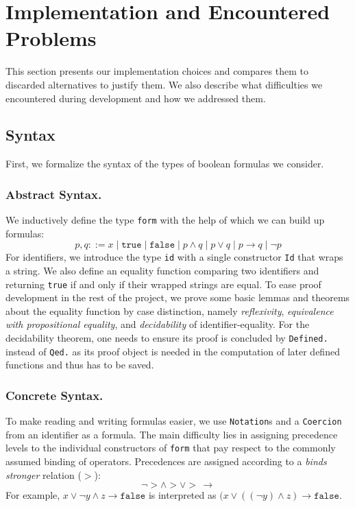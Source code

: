 \section{Implementation and Encountered Problems}\label{sec:impl}

This section presents our implementation choices and compares them to discarded alternatives to justify them. 
We also describe what difficulties we encountered during development and how we addressed them.

\subsection{Syntax}

First, we formalize the syntax of the types of boolean formulas we consider. 

\subsubsection{Abstract Syntax.}

We inductively define the type \texttt{form} with the help of which we can build up formulas:
\begin{equation*}
    p, q ::= x\;|\;\texttt{true}\;|\;\texttt{false}\;|\;p \land q\;|\;p \lor q\;|\;p \rightarrow q\;|\;\neg p
\end{equation*}
For identifiers, we introduce the type \texttt{id} with a single constructor \texttt{Id} that wraps a string. 
We also define an equality function comparing two identifiers and returning \texttt{true} if and only if their wrapped strings are equal. 
To ease proof development in the rest of the project, we prove some basic lemmas and theorems about the equality function by case distinction, namely \emph{reflexivity}, \emph{equivalence with propositional equality}, and \emph{decidability} of identifier-equality.
For the decidability theorem, one needs to ensure its proof is concluded by \texttt{Defined.} instead of \texttt{Qed.} as its proof object is needed in the computation of later defined functions and thus has to be saved.

\subsubsection{Concrete Syntax.}

To make reading and writing formulas easier, we use \texttt{Notation}s and a \texttt{Coercion} from an identifier as a formula. 
The main difficulty lies in assigning precedence levels to the individual constructors of \texttt{form} that pay respect to the commonly assumed binding of operators. 
Precedences are assigned according to a \emph{binds stronger} relation ($>$):
\begin{equation*}
    \neg > \land > \lor >\,\rightarrow
\end{equation*}
For example, $x \lor \neg y \land z \rightarrow \texttt{false}$ is interpreted as $(x \lor ((\neg y) \land z) \rightarrow \texttt{false}$. 

